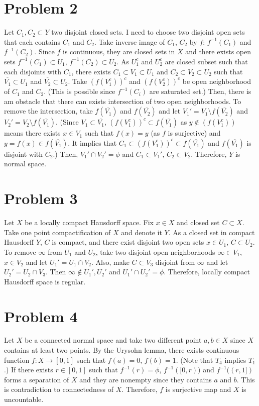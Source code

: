 \documentclass{article}
\begin{document}
\section*{Problem 2}
Let $C_1,C_2\subset Y$ two disjoint closed sets. I need to choose two disjoint open sets that each contains $C_1$ and $C_2$. Take inverse image of $C_1$, $C_2$ by $f$: $f^{-1}(C_1)$ and $f^{-1}(C_2)$. Since $f$ is continuous, they are closed sets in $X$ and there exists open sets $f^{-1}(C_1)\subset U_1$, $f^{-1}(C_2)\subset U_2$. As $U_1^c$ and $U_2^c$ are closed subset such that each disjoints with $C_1$, there exists $C_1\subset V_1\subset U_1$ and $C_2\subset V_2\subset U_2$ such that $\overline{V_1}\subset U_1$ and $\overline{V_2}\subset U_2$. Take $\left(f(V_1^c)\right)^c$ and $\left(f(V_2^c)\right)^c$ be open neighborhood of $C_1$ and $C_2$. (This is possible since $f^{-1}(C_i)$ are saturated set.) Then, there is am obstacle that there can exists intersection of two open neighborhoods. To remove the intersection, take $f(\overline{V_1})$ and $f(\overline{V_2})$ and let $V_1'=V_1\setminus f(\overline{V_2})$ and $V_2'=V_2\setminus f(\overline{V_1})$. (Since $V_1\subset \overline{V_1}$, $\left(f(V_1^c)\right)^c\subset f(\overline{V_1})$ as $y\notin \left(f(V_1^c)\right)$ means there exists $x\in V_1$ such that $f(x)=y$ (as $f$ is surjective) and $y=f(x)\in f(\overline{V_1})$. It implies that $C_1\subset \left(f(V_1^c)\right)^c\subset f(\overline{V_1})$ and $f(\overline{V_1})$ is disjoint with $C_2$.) Then, $V_1'\cap V_2'=\phi$ and $C_1\subset V_1'$, $C_2\subset V_2$. Therefore, $Y$ is normal space. 
\section*{Problem 3}
Let $X$ be a locally compact Hausdorff space. Fix $x\in X$ and closed set $C\subset X$. Take one point compactification of $X$ and denote it $Y$. As a closed set in compact Hausdorff $Y$, $C$ is compact, and there exist disjoint two open sets $x\in U_1$, $C\subset U_2$. To remove $\infty$ from $U_1$ and $U_2$, take two disjoint open neighborhoods $\infty\in V_1$, $x\in V_2$ and let $U_1'=U_1\cap V_2$. Also, make $C\subset V_3$ disjoint from $\infty$ and let $U_2'=U_2\cap V_3$. Then $\infty\notin U_1',U_2'$ and $U_1'\cap U_2'=\phi$. Therefore, locally compact Hausdorff space is regular.
\section*{Problem 4}
Let $X$ be a connected normal space and take two different point $a,b\in X$ since $X$ contains at least two points. By the Urysohn lemma, there exists continuous function $f:X\rightarrow [0, 1]$ such that $f(a)=0$, $f(b)=1$. (Note that $T_4$ implies $T_1$.) If there exists $r\in [0,1]$ such that $f^{-1}(r)=\phi$, $f^{-1}([0,r))$ and $f^{-1}((r, 1])$ forms a separation of $X$ and they are nonempty since they contains $a$ and $b$. This is contradiction to connectedness of $X$. Therefore, $f$ is surjective map and $X$ is uncountable.
\end{document}
